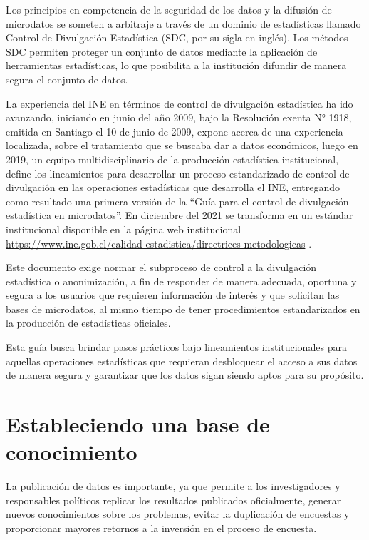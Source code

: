 \documentclass[]{book}
\theoremstyle{definition}
\theoremstyle{definition}
\theoremstyle{definition}
\theoremstyle{definition}
\theoremstyle{remark}
\begin{document}
Los principios en competencia de la seguridad de los datos y la difusión de microdatos se someten a arbitraje a través de un dominio de estadísticas llamado Control de Divulgación Estadística (SDC, por su sigla en inglés). Los métodos SDC permiten proteger un conjunto de datos mediante la aplicación de herramientas estadísticas, lo que posibilita a la institución difundir de manera segura el conjunto de datos.

La experiencia del INE en términos de control de divulgación estadística ha ido avanzando, iniciando en junio del año 2009, bajo la Resolución exenta N° 1918, emitida en Santiago el 10 de junio de 2009, expone acerca de una experiencia localizada, sobre el tratamiento que se buscaba dar a datos económicos, luego en 2019, un equipo multidisciplinario de la producción estadística institucional, define los lineamientos para desarrollar un proceso estandarizado de control de divulgación en las operaciones estadísticas que desarrolla el INE, entregando como resultado una primera versión de la ``Guía para el control de divulgación estadística en microdatos''. En diciembre del 2021 se transforma en un estándar institucional disponible en la página web institucional \url{https://www.ine.gob.cl/calidad-estadistica/directrices-metodologicas} \citep{institutonacionaldeestadisticas2021}.

Este documento exige normar el subproceso de control a la divulgación estadística o anonimización, a fin de responder de manera adecuada, oportuna y segura a los usuarios que requieren información de interés y que solicitan las bases de microdatos, al mismo tiempo de tener procedimientos estandarizados en la producción de estadísticas oficiales.

Esta guía busca brindar pasos prácticos bajo lineamientos institucionales para aquellas operaciones estadísticas que requieran desbloquear el acceso a sus datos de manera segura y garantizar que los datos sigan siendo aptos para su propósito.

\hypertarget{estableciendo-una-base-de-conocimiento}{%
\section{Estableciendo una base de conocimiento}\label{estableciendo-una-base-de-conocimiento}}

La publicación de datos es importante, ya que permite a los investigadores y responsables políticos replicar los resultados publicados oficialmente, generar nuevos conocimientos sobre los problemas, evitar la duplicación de encuestas y proporcionar mayores retornos a la inversión en el proceso de encuesta.
\end{document}

